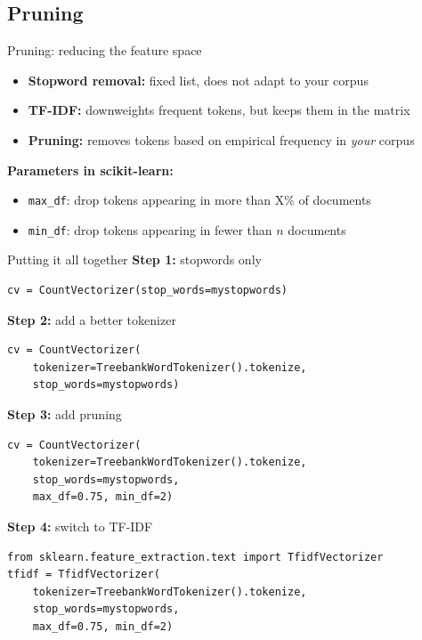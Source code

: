 \documentclass[handout]{beamer}
\begin{document}
\subsection{Pruning}

\begin{frame}{Pruning: reducing the feature space}
\begin{itemize}
    \item \textbf{Stopword removal:} fixed list, does not adapt to your corpus
    \item \textbf{TF-IDF:} downweights frequent tokens, but keeps them in the matrix
    \item \textbf{Pruning:} removes tokens based on empirical frequency in \emph{your} corpus
\end{itemize}

\vspace{0.5em}
\textbf{Parameters in scikit-learn:}
\begin{itemize}
    \item \texttt{max\_df}: drop tokens appearing in more than X\% of documents
    \item \texttt{min\_df}: drop tokens appearing in fewer than $n$ documents
\end{itemize}
\end{frame}

\begin{frame}[fragile]{Putting it all together}
\textbf{Step 1:} stopwords only
\begin{verbatim}
cv = CountVectorizer(stop_words=mystopwords)
\end{verbatim}

\textbf{Step 2:} add a better tokenizer
\begin{verbatim}
cv = CountVectorizer(
    tokenizer=TreebankWordTokenizer().tokenize,
    stop_words=mystopwords)
\end{verbatim}

\textbf{Step 3:} add pruning
\begin{verbatim}
cv = CountVectorizer(
    tokenizer=TreebankWordTokenizer().tokenize,
    stop_words=mystopwords,
    max_df=0.75, min_df=2)
\end{verbatim}

\textbf{Step 4:} switch to TF-IDF
\begin{verbatim}
from sklearn.feature_extraction.text import TfidfVectorizer
tfidf = TfidfVectorizer(
    tokenizer=TreebankWordTokenizer().tokenize,
    stop_words=mystopwords,
    max_df=0.75, min_df=2)
\end{verbatim}
\end{frame}
\end{document}
